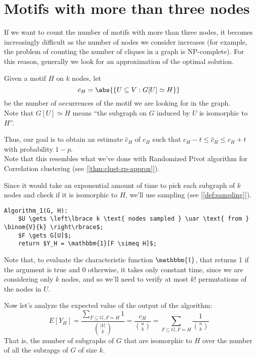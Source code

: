 \section{Motifs with more than three nodes}\label{sec:big-motifs}

If we want to count the number of motifs with more than three nodes, it becomes increasingly difficult as the number of nodes we consider increases (for example, the problem of counting the number of cliques in a graph is NP-complete). For this reason, generally we look for an approximation of the optimal solution.

\begin{defn}
    Given a motif $H$ on $k$ nodes, let
    \begin{equation}\label{eq:motif}
        c_H = \abs{\{U \subseteq V : G[U] \simeq H\}}
    \end{equation}
    be the number of occurrences of the motif we are looking for in the graph.\\
    Note that $G[U] \simeq H$ means ``the subgraph on $G$ induced by $U$ is isomorphic to $H$''. 
\end{defn}

Thus, our goal is to obtain an estimate $\hat{c}_H$ of $c_H$ such that $c_H - t \leq \hat{c}_H \leq c_H + t$ with probability $1-p$.\\
Note that this resembles what we've done with Randomized Pivot algorithm for Correlation clustering (see [\ref{thm:clust-rp-approx}]).

Since it would take an exponential amount of time to pick each subgraph of $k$ nodes and check if it is isomorphic to $H$, we'll use sampling (see [\ref{def:sampling}]).

\begin{lstlisting}[caption={Algorithm 1}, label={lst:motifs-alg1}]
Algorithm_1(G, H):
    $U \gets \left\lbrace k \text{ nodes sampled } \uar \text{ from } \binom{V}{k} \right\rbrace$;
    $F \gets G[U]$;
    return $Y_H = \mathbbm{1}[F \simeq H]$;
\end{lstlisting}
Note that, to evaluate the characteristic function $\mathbbm{1}$, that returns 1 if the argument is true and 0 otherwise, it takes only constant time, since we are considering only $k$ nodes, and so we'll need to verify at most $k!$ permutations of the nodes in $U$.

Now let's analyze the expected value of the output of the algorithm:
\begin{equation}\label{eq:eyh-1}
    E[Y_H] = \frac{\sum_{F \subseteq G, F \simeq H} 1}{\binom{|V|}{k}} = \frac{c_H}{\binom{n}{k}} = \sum_{F \subseteq G, F \simeq H} \frac{1}{\binom{n}{k}}
\end{equation}
That is, the number of subgraphs of $G$ that are isomorphic to $H$ over the number of all the subrapgs of $G$ of size $k$.

